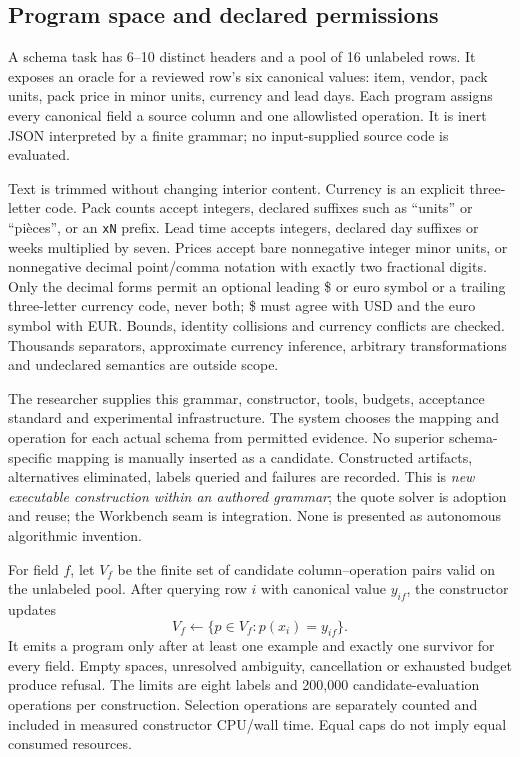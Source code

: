\documentclass[11pt,letterpaper]{article}
\newcommand{\code}[1]{\texttt{\small #1}}
\begin{document}
\subsection{Program space and declared permissions}

A schema task has 6--10 distinct headers and a pool of 16 unlabeled rows. It exposes an oracle for a reviewed row's six canonical values: item, vendor, pack units, pack price in minor units, currency and lead days. Each program assigns every canonical field a source column and one allowlisted operation. It is inert JSON interpreted by a finite grammar; no input-supplied source code is evaluated.

Text is trimmed without changing interior content. Currency is an explicit three-letter code. Pack counts accept integers, declared suffixes such as ``units'' or ``pièces'', or an \code{xN} prefix. Lead time accepts integers, declared day suffixes or weeks multiplied by seven. Prices accept bare nonnegative integer minor units, or nonnegative decimal point/comma notation with exactly two fractional digits. Only the decimal forms permit an optional leading \$ or euro symbol or a trailing three-letter currency code, never both; \$ must agree with USD and the euro symbol with EUR. Bounds, identity collisions and currency conflicts are checked. Thousands separators, approximate currency inference, arbitrary transformations and undeclared semantics are outside scope.

The researcher supplies this grammar, constructor, tools, budgets, acceptance standard and experimental infrastructure. The system chooses the mapping and operation for each actual schema from permitted evidence. No superior schema-specific mapping is manually inserted as a candidate. Constructed artifacts, alternatives eliminated, labels queried and failures are recorded. This is \emph{new executable construction within an authored grammar}; the quote solver is adoption and reuse; the Workbench seam is integration. None is presented as autonomous algorithmic invention.

For field $f$, let $V_f$ be the finite set of candidate column--operation pairs valid on the unlabeled pool. After querying row $i$ with canonical value $y_{if}$, the constructor updates
\begin{equation}
 V_f \leftarrow \{p\in V_f:p(x_i)=y_{if}\}.
\end{equation}
It emits a program only after at least one example and exactly one survivor for every field. Empty spaces, unresolved ambiguity, cancellation or exhausted budget produce refusal. The limits are eight labels and 200,000 candidate-evaluation operations per construction. Selection operations are separately counted and included in measured constructor CPU/wall time. Equal caps do not imply equal consumed resources.
\end{document}
